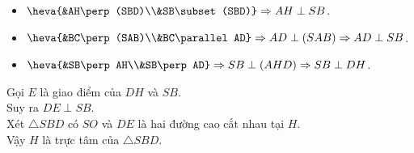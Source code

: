 \begin{ex}
{\begin{enumerate}
\begin{itemize}
	$\Rightarrow AH\perp (SBD)$ hay $H$ là hình chiếu của $A$ lên mặt phẳng $(SBD)$.
	\item $\heva{&AH\perp(SBD)\\&SB\subset(SBD)}\Rightarrow AH\perp SB$.\\
	\item $\heva{&BC\perp (SAB)\\&BC\parallel AD}\Rightarrow AD\perp (SAB) \Rightarrow AD\perp SB$.
	\item $\heva{&SB\perp AH\\&SB\perp AD}\Rightarrow SB\perp (AHD)\Rightarrow SB\perp DH$.
	\end{itemize}
	Gọi $E$ là giao điểm của $DH$ và $SB$.\\
	Suy ra $DE\perp SB$.\\
	Xét $\triangle SBD$ có $SO$ và $DE$ là hai đường cao cắt nhau tại $H$.\\
	Vậy $H$ là trực tâm của $\triangle SBD$.
	\end{enumerate}

	}
\end{ex}

